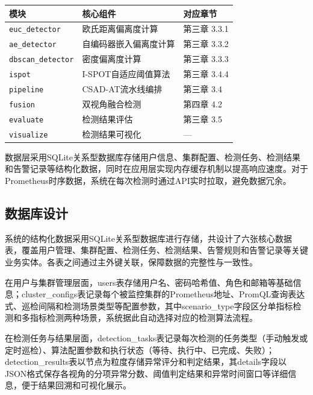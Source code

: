\begin{table}[htbp]
    \centering
    \label{tab:code_structure}
    \begin{tabular}{lll}
        \toprule
        模块 & 核心组件 & 对应章节 \\
        \midrule
        \texttt{euc\_detector} & 欧氏距离偏离度计算 & 第三章 3.3.1 \\
        \texttt{ae\_detector} & 自编码器嵌入偏离度计算 & 第三章 3.3.2 \\
        \texttt{dbscan\_detector} & 密度偏离度计算 & 第三章 3.3.3 \\
        \texttt{ispot} & I-SPOT自适应阈值算法 & 第三章 3.4.4 \\
        \texttt{pipeline} & CSAD-AT流水线编排 & 第三章 3.4 \\
        \texttt{fusion} & 双视角融合检测 & 第四章 4.2 \\
        \texttt{evaluate} & 检测结果评估 & 第三章 3.5 \\
        \texttt{visualize} & 检测结果可视化 & --- \\
        \bottomrule
    \end{tabular}
\end{table}

数据层采用SQLite关系型数据库存储用户信息、集群配置、检测任务、检测结果和告警记录等结构化数据，同时在应用层实现内存缓存机制以提高响应速度。对于Prometheus时序数据，系统在每次检测时通过API实时拉取，避免数据冗余。

\subsection{数据库设计}

系统的结构化数据采用SQLite关系型数据库进行存储，共设计了六张核心数据表，覆盖用户管理、集群配置、检测任务、检测结果、告警规则和告警记录等关键业务实体。各表之间通过主外键关联，保障数据的完整性与一致性。

在用户与集群管理层面，users表存储用户名、密码哈希值、角色和邮箱等基础信息；cluster\_configs表记录每个被监控集群的Prometheus地址、PromQL查询表达式、巡检间隔和检测场景类型等配置参数，其中scenario\_type字段区分单指标检测和多指标检测两种场景，系统据此自动选择对应的检测算法流程。

在检测任务与结果层面，detection\_tasks表记录每次检测的任务类型（手动触发或定时巡检）、算法配置参数和执行状态（等待、执行中、已完成、失败）；detection\_results表以节点为粒度存储异常评分和判定结果，其details字段以JSON格式保存各视角的分项异常分数、阈值判定结果和异常时间窗口等详细信息，便于结果回溯和可视化展示。

